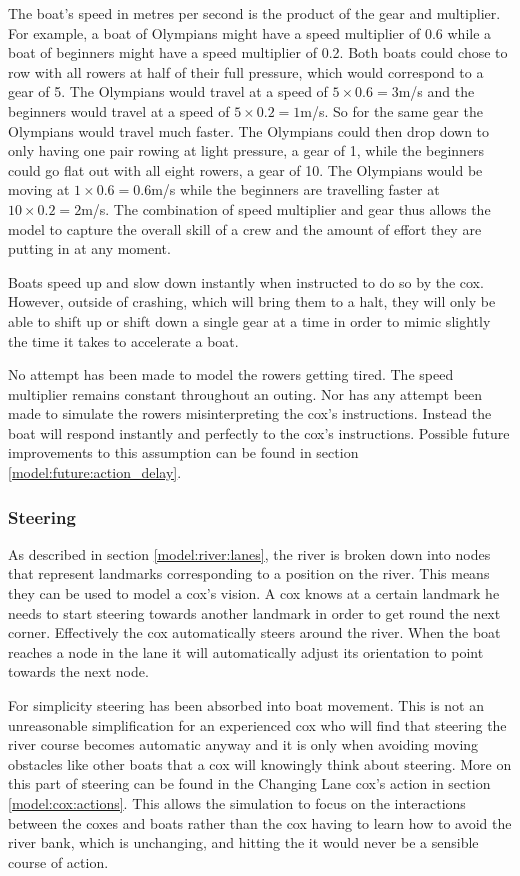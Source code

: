       The boat's speed in metres per second is the product of the gear and multiplier. For example, a boat of Olympians might have a speed multiplier of 0.6 while a boat of beginners might have a speed multiplier of 0.2. Both boats could chose to row with all rowers at half of their full pressure, which would correspond to a gear of 5. The Olympians would travel at a speed of $5\times0.6=3$m/s and the beginners would travel at a speed of $5\times0.2=1$m/s. So for the same gear the Olympians would travel much faster. The Olympians could then drop down to only having one pair rowing at light pressure, a gear of 1, while the beginners could go flat out with all eight rowers, a gear of 10. The Olympians would be moving at $1\times0.6=0.6$m/s while the beginners are travelling faster at $10\times0.2=2$m/s. The combination of speed multiplier and gear thus allows the model to capture the overall skill of a crew and the amount of effort they are putting in at any moment.
      
      Boats speed up and slow down instantly when instructed to do so by the cox. However, outside of crashing, which will bring them to a halt, they will only be able to shift up or shift down a single gear at a time in order to mimic slightly the time it takes to accelerate a boat.
      
      No attempt has been made to model the rowers getting tired. The speed multiplier remains constant throughout an outing. Nor has any attempt been made to simulate the rowers misinterpreting the cox's instructions. Instead the boat will respond instantly and perfectly to the cox's instructions. Possible future improvements to this assumption can be found in section \ref{model:future:action_delay}.
      
      \subsubsection{Steering}
      As described in section \ref{model:river:lanes}, the river is broken down into nodes that represent landmarks corresponding to a position on the river. This means they can be used to model a cox's vision. A cox knows at a certain landmark he needs to start steering towards another landmark in order to get round the next corner. Effectively the cox automatically steers around the river. When the boat reaches a node in the lane it will automatically adjust its orientation to point towards the next node. 
      
      For simplicity steering has been absorbed into boat movement. This is not an unreasonable simplification for an experienced cox who will find that steering the river course becomes automatic anyway and it is only when avoiding moving obstacles like other boats that a cox will knowingly think about steering. More on this part of steering can be found in the Changing Lane cox's action in section \ref{model:cox:actions}. This allows the simulation to focus on the interactions between the coxes and boats rather than the cox having to learn how to avoid the river bank, which is unchanging, and hitting the it would never be a sensible course of action.
      
